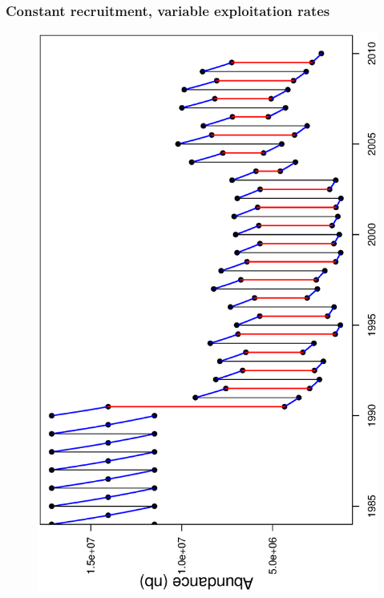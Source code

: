 \documentclass{beamer}
\begin{document}

\begin{frame}
\frametitle{Constant recruitment, variable exploitation rates}

\begin{figure}
  \includegraphics[scale=0.38, angle=-90]{../../TestCASAL2_withSimulatedData/StockDescriptionInNumbers/EstimateSingleConstantRecruitment/ByPassingInitialAbundancesToCASAL2/Results/Graphics/PopDynamics.ps}
  \end{figure}

\end{frame}
\end{document}

